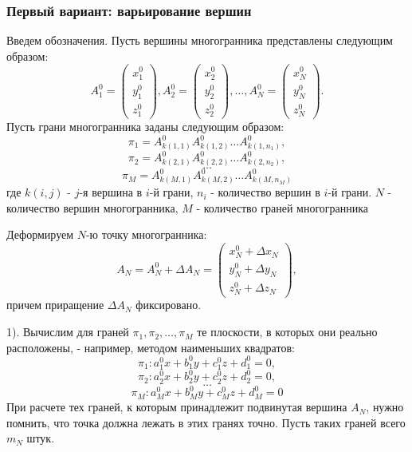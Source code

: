 \documentclass[a4paper,12pt, titlepage]{article}
\begin{document}
\subsubsection{Первый вариант: варьирование вершин}
	\begin{flushleft}
		Введем обозначения. Пусть вершины многогранника представлены следующим образом:
		$$
		  A^{0}_{1} = \begin{pmatrix}x^{0}_{1}\\y^{0}_{1}\\z^{0}_{1}\end{pmatrix},
		  A^{0}_{2} = \begin{pmatrix}x^{0}_{2}\\y^{0}_{2}\\z^{0}_{2}\end{pmatrix},
		  \ldots, 
		  A^{0}_{N} = \begin{pmatrix}x^{0}_{N}\\y^{0}_{N}\\z^{0}_{N}\end{pmatrix}.
		$$
		Пусть грани многогранника заданы следующим образом:
		$$\pi_{1} = A^{0}_{k(1, 1)} A^{0}_{k(1, 2)} \ldots A^{0}_{k(1, n_{1})},$$
		$$\pi_{2} = A^{0}_{k(2, 1)} A^{0}_{k(2, 2)} \ldots A^{0}_{k(2, n_{2})},$$
		$$\ldots$$
		$$\pi_{M} = A^{0}_{k(M, 1)} A^{0}_{k(M, 2)} \ldots A^{0}_{k(M, n_{M})}$$
		где $k(i, j)$ - $j$-я вершина в $i$-й грани, $n_{i}$ - количество вершин
		в $i$-й грани. $N$ - количество вершин многогранника, $M$ - количество граней
		многогранника
	\end{flushleft}
	\begin{flushleft}
		Деформируем $N$-ю точку многогранника: 
		$$
		  A_{N} = A^{0}_{N} + \Delta A_{N} = 
		  \begin{pmatrix}
				 x^{0}_{N} + \Delta x_{N}\\
				 y^{0}_{N} + \Delta y_{N}\\
				 z^{0}_{N} + \Delta z_{N}
		  \end{pmatrix},
		$$
		причем приращение $\Delta A_{N}$ фиксировано.
	\end{flushleft}
	\begin{flushleft}
		1). Вычислим для граней $\pi_{1}, \pi_{2}, \ldots, \pi_{M}$ те плоскости, в которых они
		реально расположены, - например, методом наименьших квадратов:
		$$\pi_{1} : a^{0}_{1} x + b^{0}_{1} y + c^{0}_{1} z + d^{0}_{1} = 0,$$
		$$\pi_{2} : a^{0}_{2} x + b^{0}_{2} y + c^{0}_{2} z + d^{0}_{2} = 0,$$
		$$\ldots$$
		$$\pi_{M} : a^{0}_{M} x + b^{0}_{M} y + c^{0}_{M} z + d^{0}_{M} = 0$$
		При расчете тех граней, к которым принадлежит подвинутая вершина $A_{N}$, нужно
		помнить, что точка должна лежать в этих гранях точно. Пусть таких граней всего $m_{N}$ 
		штук.
	\end{flushleft}
\end{document}
